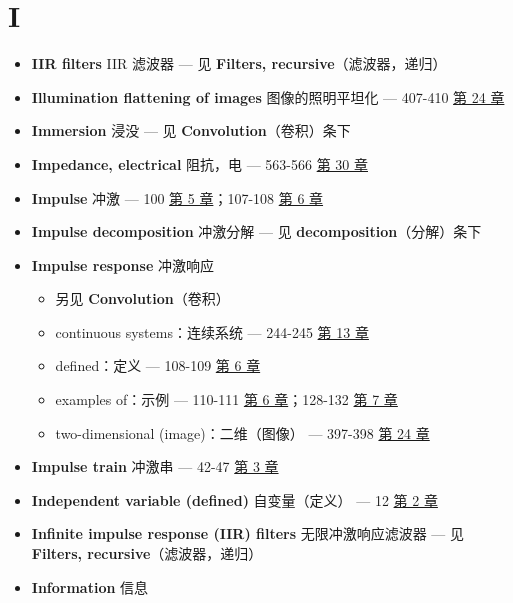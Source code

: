 \section{I}

\begin{itemize}
\tightlist
\item
  \textbf{IIR filters} IIR 滤波器 --- 见 \textbf{Filters,
  recursive}（滤波器，递归）
\item
  \textbf{Illumination flattening of images} 图像的照明平坦化 ---
  407-410  \hyperref[ch-24]{第 24 章}
\item
  \textbf{Immersion} 浸没 --- 见 \textbf{Convolution}（卷积）条下
\item
  \textbf{Impedance, electrical} 阻抗，电 --- 563-566 
  \hyperref[ch-30]{第 30 章}
\item
  \textbf{Impulse} 冲激 --- 100  \hyperref[ch-05]{第 5
  章}；107-108  \hyperref[ch-06]{第 6 章}
\item
  \textbf{Impulse decomposition} 冲激分解 --- 见
  \textbf{decomposition}（分解）条下
\item
  \textbf{Impulse response} 冲激响应

  \begin{itemize}
  \tightlist
  \item
    另见 \textbf{Convolution}（卷积）
  \item
    continuous systems：连续系统 --- 244-245 
    \hyperref[ch-13]{第 13 章}
  \item
    defined：定义 --- 108-109  \hyperref[ch-06]{第 6 章}
  \item
    examples of：示例 --- 110-111  \hyperref[ch-06]{第 6
    章}；128-132  \hyperref[ch-07]{第 7 章}
  \item
    two-dimensional (image)：二维（图像） --- 397-398 
    \hyperref[ch-24]{第 24 章}
  \end{itemize}
\item
  \textbf{Impulse train} 冲激串 --- 42-47  \hyperref[ch-03]{第
  3 章}
\item
  \textbf{Independent variable (defined)} 自变量（定义） --- 12
   \hyperref[ch-02]{第 2 章}
\item
  \textbf{Infinite impulse response (IIR) filters} 无限冲激响应滤波器
  --- 见 \textbf{Filters, recursive}（滤波器，递归）
\item
  \textbf{Information} 信息


\end{itemize}

